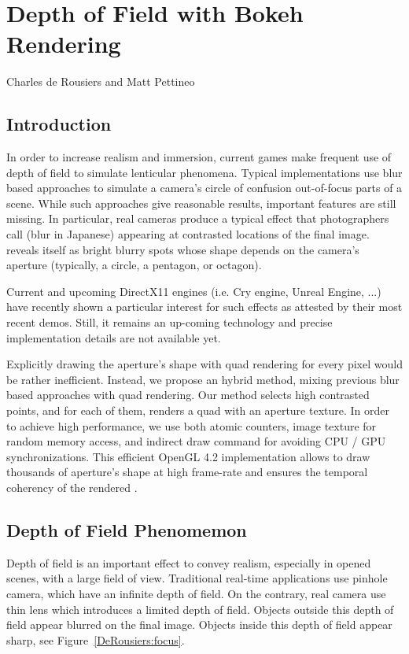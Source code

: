 \chapter{Depth of Field with Bokeh Rendering}{Charles de Rousiers and Matt Pettineo}
\label{BokehRendering}

\section{Introduction}

In order to increase realism and immersion, current games make frequent use of depth of field to simulate lenticular phenomena. Typical implementations use blur based approaches to simulate a camera’s circle of confusion out-of-focus parts of a scene. While such approaches give reasonable results, important features are still missing. In particular, real cameras produce a typical effect that photographers call \bokeh (blur in Japanese) appearing at contrasted locations of the final image. \Bokeh reveals itself as  bright blurry spots whose shape depends on the camera’s aperture (typically, a circle, a pentagon, or octagon).

Current and upcoming DirectX11 engines (i.e. Cry engine, Unreal Engine, ...) have recently shown a particular interest for such effects as attested by their most recent demos. Still, it  remains an up-coming technology and precise implementation details are not available yet.

Explicitly drawing the aperture’s shape with quad rendering for every pixel would be rather inefficient. Instead, we propose an hybrid method, mixing previous blur based approaches with quad rendering. Our method selects high contrasted points, and for each of them, renders a quad with an aperture texture. In order to achieve high performance, we use both atomic counters, image texture for random memory access, and indirect draw command for avoiding CPU / GPU synchronizations. This efficient OpenGL 4.2 implementation allows to draw thousands of aperture’s shape at high frame-rate and ensures the temporal coherency of the rendered \bokeh.

\section{Depth of Field Phenomemon}\label{Derousiers:DOFPhenomenon}
Depth of field is an important effect to convey realism, especially in opened scenes, with a large field of view. Traditional real-time applications use pinhole camera, which have an infinite depth of field. On the contrary, real camera use thin lens which introduces a limited depth of field. Objects outside this depth of field appear blurred on the final image. Objects inside this depth of field appear sharp, see Figure~\ref{DeRousiers:focus}.

